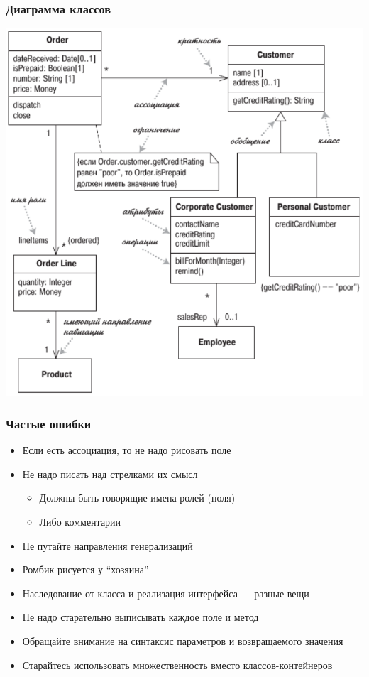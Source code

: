 \documentclass{../../slides-style}
\begin{document}
    \begin{frame}[plain]
        \titlepage
    \end{frame}

    \begin{frame}
        \frametitle{Диаграмма классов}
        \begin{center}
            \includegraphics[height=0.8\textheight]{umlClassDiagram.png}
        \end{center}
    \end{frame}

    \begin{frame}
        \frametitle{Частые ошибки}
        \begin{itemize}
            \item Если есть ассоциация, то не надо рисовать поле
            \item Не надо писать над стрелками их смысл
            \begin{itemize}
                \item Должны быть говорящие имена ролей (поля)
                \item Либо комментарии
            \end{itemize}
            \item Не путайте направления генерализаций
            \item Ромбик рисуется у \enquote{хозяина}
            \item Наследование от класса и реализация интерфейса --- разные вещи
            \item Не надо старательно выписывать каждое поле и метод
            \item Обращайте внимание на синтаксис параметров и возвращаемого значения
            \item Старайтесь использовать множественность вместо классов-контейнеров
        \end{itemize}
    \end{frame}
\end{document}
